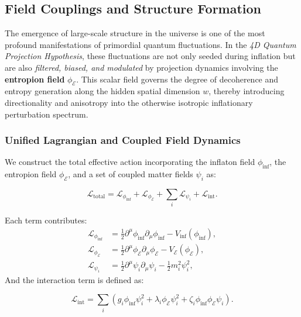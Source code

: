 \documentclass[12pt]{article}
\begin{document}
\subsection{Field Couplings and Structure Formation}
\label{subsec:field_couplings_structure}

The emergence of large-scale structure in the universe is one of the most profound manifestations of primordial quantum fluctuations. In the \emph{4D Quantum Projection Hypothesis}, these fluctuations are not only seeded during inflation but are also \emph{filtered, biased, and modulated} by projection dynamics involving the \textbf{entropion field} \(\phi_{\mathcal{E}}\). This scalar field governs the degree of decoherence and entropy generation along the hidden spatial dimension \(w\), thereby introducing directionality and anisotropy into the otherwise isotropic inflationary perturbation spectrum.

\subsubsection*{Unified Lagrangian and Coupled Field Dynamics}

We construct the total effective action incorporating the inflaton field \(\phi_{\text{inf}}\), the entropion field \(\phi_{\mathcal{E}}\), and a set of coupled matter fields \(\psi_i\) as:

\begin{equation}
\label{eq:lagrangian_total}
\mathcal{L}_{\text{total}} = \mathcal{L}_{\phi_{\text{inf}}} + \mathcal{L}_{\phi_{\mathcal{E}}} + \sum_i \mathcal{L}_{\psi_i} + \mathcal{L}_{\text{int}}.
\end{equation}

Each term contributes:
\begin{align}
\mathcal{L}_{\phi_{\text{inf}}} &= \frac{1}{2} \partial^\mu \phi_{\text{inf}} \partial_\mu \phi_{\text{inf}} - V_{\text{inf}}(\phi_{\text{inf}}), \\
\mathcal{L}_{\phi_{\mathcal{E}}} &= \frac{1}{2} \partial^\mu \phi_{\mathcal{E}} \partial_\mu \phi_{\mathcal{E}} - V_{\mathcal{E}}(\phi_{\mathcal{E}}), \\
\mathcal{L}_{\psi_i} &= \frac{1}{2} \partial^\mu \psi_i \partial_\mu \psi_i - \frac{1}{2} m_i^2 \psi_i^2,
\end{align}
And the interaction term is defined as:

\begin{equation}
\label{eq:interaction_lagrangian}
\mathcal{L}_{\text{int}} = \sum_i \left( g_i \phi_{\text{inf}} \psi_i^2 + \lambda_i \phi_{\mathcal{E}} \psi_i^2 + \zeta_i \phi_{\text{inf}} \phi_{\mathcal{E}} \psi_i \right).
\end{equation}
\end{document}
